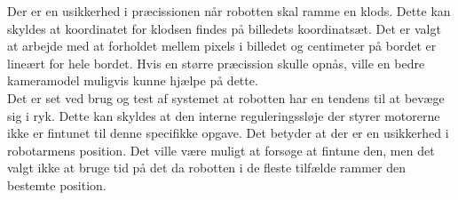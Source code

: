 Der er en usikkerhed i præcissionen når robotten skal ramme en klods. Dette kan skyldes at koordinatet for klodsen findes på billedets koordinatsæt. Det er valgt at arbejde med at forholdet mellem pixels i billedet og centimeter på bordet er lineært for hele bordet. Hvis en større præcission skulle opnås, ville en bedre kameramodel muligvis kunne hjælpe på dette.\\

Det er set ved brug og test af systemet at robotten har en tendens til at bevæge sig i ryk. Dette kan skyldes at den interne reguleringssløje der styrer motorerne ikke er fintunet til denne specifikke opgave. Det betyder at der er en usikkerhed i robotarmens position. Det ville være muligt at forsøge at fintune den, men det valgt ikke at bruge tid på det da robotten i de fleste tilfælde rammer den bestemte position.\\